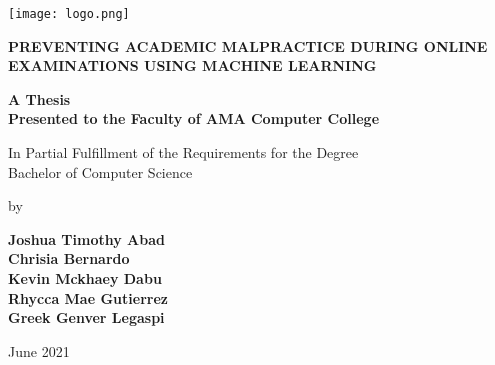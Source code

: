 \begin{titlepage}
   \begin{center}
      \vspace{6em}

      \texttt{[image: logo.png]}

      \begingroup
      \textbf{
         \uppercase{Preventing Academic Malpractice During Online Examinations using Machine Learning}
      }
      \endgroup

      \vspace{6em}

      \textbf{A Thesis\\
         Presented to the Faculty of AMA Computer College}

      \vspace{6em}

      In Partial Fulfillment of the Requirements for the Degree\\
      Bachelor of Computer Science

      \vspace{5em}

      by

      \vspace{3em}

      \textbf{
         Joshua Timothy Abad \\
         Chrisia Bernardo \\
         Kevin Mckhaey Dabu \\
         Rhycca Mae Gutierrez \\
         Greek Genver Legaspi
      }

      \vspace{2em}

      June 2021

   \end{center}
\end{titlepage}
